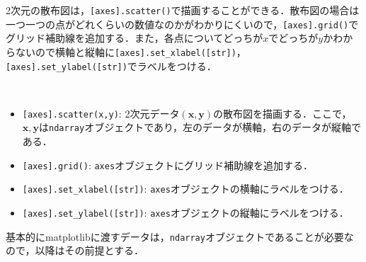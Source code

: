 2次元の散布図は，\texttt{[axes].scatter()}で描画することができる．散布図の場合は一つ一つの点がどれくらいの数値なのかがわかりにくいので，\texttt{[axes].grid()}でグリッド補助線を追加する．また，各点についてどっちが$x$でどっちが$y$かわからないので横軸と縦軸に\texttt{[axes].set\_xlabel([str])}，\texttt{[axes].set\_ylabel([str])}でラベルをつける．
\begin{gram}　
\begin{itemize}
\item \texttt{[axes].scatter(x,y)}: 2次元データ$(\bm{x},\bm{y})$の散布図を描画する．ここで，$\bm{x},\bm{y}$は\texttt{ndarray}オブジェクトであり，左のデータが横軸，右のデータが縦軸である．
\item \texttt{[axes].grid()}: \texttt{axes}オブジェクトにグリッド補助線を追加する．
\item \texttt{[axes].set\_xlabel([str])}: \texttt{axes}オブジェクトの横軸にラベルをつける．
\item \texttt{[axes].set\_ylabel([str])}: \texttt{axes}オブジェクトの縦軸にラベルをつける．
\end{itemize}
\end{gram}


\begin{rem}
基本的にmatplotlibに渡すデータは，\texttt{ndarray}オブジェクトであることが必要なので，以降はその前提とする．
\end{rem}

\begin{cod}[\texttt{fig2.py}]　
}]{code/fig2.py}
\vspace{-19pt}
\begin{figure}[H]
\begin{center}
\framed
\texttt{[image: code/fig2.eps]}
\vspace{-10pt}
\caption{\texttt{fig2.eps}}
\endframed
\end{center}
\end{figure}
\end{cod}
\vspace{-20pt}